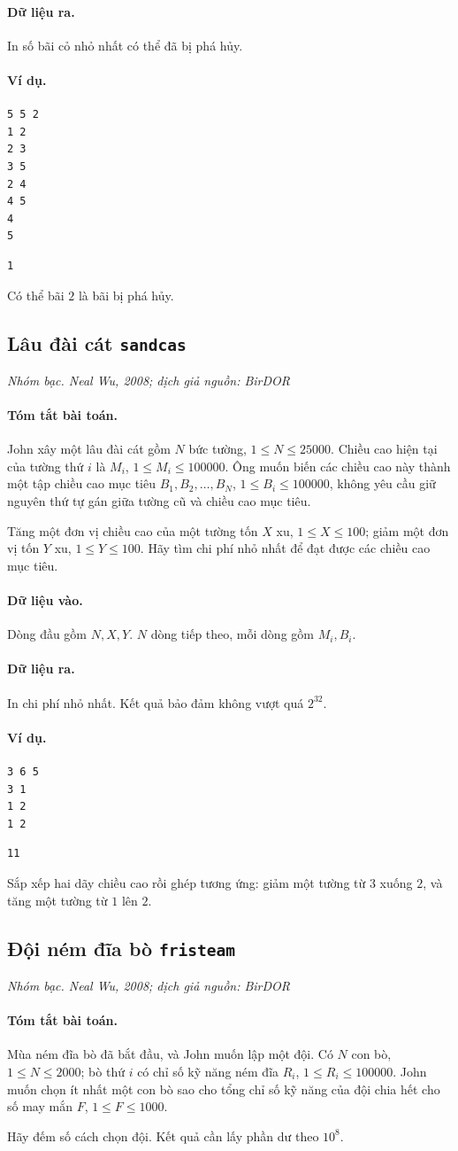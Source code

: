 \documentclass[11pt]{article}
\newcommand{\problem}[4]{%
  \subsection[#1 (#2)]{#1 \hfill {\normalsize\texttt{#2}}}%
  \noindent\textit{#3. #4}\par\smallskip
}
\newcommand{\iosec}[1]{\paragraph{#1}}
\begin{document}
\iosec{Dữ liệu ra.}
In số bãi cỏ nhỏ nhất có thể đã bị phá hủy.

\iosec{Ví dụ.}
\begin{verbatim}
5 5 2
1 2
2 3
3 5
2 4
4 5
4
5
\end{verbatim}

\begin{verbatim}
1
\end{verbatim}

Có thể bãi \(2\) là bãi bị phá hủy.

\problem{Lâu đài cát}{sandcas}{Nhóm bạc}{Neal Wu, 2008; dịch giả nguồn: BirDOR}

\iosec{Tóm tắt bài toán.}
John xây một lâu đài cát gồm \(N\) bức tường, \(1\le N\le 25000\). Chiều cao
hiện tại của tường thứ \(i\) là \(M_i\), \(1\le M_i\le 100000\). Ông muốn
biến các chiều cao này thành một tập chiều cao mục tiêu
\(B_1,B_2,\ldots,B_N\), \(1\le B_i\le 100000\), không yêu cầu giữ nguyên thứ
tự gán giữa tường cũ và chiều cao mục tiêu.

Tăng một đơn vị chiều cao của một tường tốn \(X\) xu, \(1\le X\le 100\);
giảm một đơn vị tốn \(Y\) xu, \(1\le Y\le 100\). Hãy tìm chi phí nhỏ nhất để
đạt được các chiều cao mục tiêu.

\iosec{Dữ liệu vào.}
Dòng đầu gồm \(N,X,Y\). \(N\) dòng tiếp theo, mỗi dòng gồm \(M_i,B_i\).

\iosec{Dữ liệu ra.}
In chi phí nhỏ nhất. Kết quả bảo đảm không vượt quá \(2^{32}\).

\iosec{Ví dụ.}
\begin{verbatim}
3 6 5
3 1
1 2
1 2
\end{verbatim}

\begin{verbatim}
11
\end{verbatim}

Sắp xếp hai dãy chiều cao rồi ghép tương ứng: giảm một tường từ \(3\) xuống
\(2\), và tăng một tường từ \(1\) lên \(2\).

\problem{Đội ném đĩa bò}{fristeam}{Nhóm bạc}{Neal Wu, 2008; dịch giả nguồn: BirDOR}

\iosec{Tóm tắt bài toán.}
Mùa ném đĩa bò đã bắt đầu, và John muốn lập một đội. Có \(N\) con bò,
\(1\le N\le 2000\); bò thứ \(i\) có chỉ số kỹ năng ném đĩa \(R_i\),
\(1\le R_i\le 100000\). John muốn chọn ít nhất một con bò sao cho tổng chỉ số
kỹ năng của đội chia hết cho số may mắn \(F\), \(1\le F\le 1000\).

Hãy đếm số cách chọn đội. Kết quả cần lấy phần dư theo \(10^8\).
\end{document}
